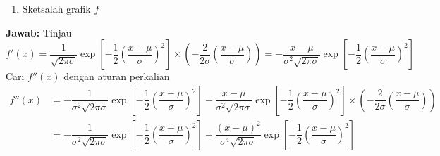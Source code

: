 \documentclass{article}
\begin{document}
\begin{enumerate}
\begin{enumerate}
		\item Sketsalah grafik $f$
	\end{enumerate}
	\textbf{Jawab:} 
	Tinjau 
	$$ f'(x) = \dfrac{1}{\sqrt{2\pi\sigma}} \exp\left[-\dfrac{1}{2}(\dfrac{x-\mu}{\sigma})^2\right]\times \left(-\dfrac{2}{2\sigma}(\dfrac{x-\mu}{\sigma})\right)=-\dfrac{x-\mu}{\sigma^2\sqrt{2\pi\sigma}} \exp\left[-\dfrac{1}{2}(\dfrac{x-\mu}{\sigma})^2\right]$$
	Cari $f''(x)$ dengan aturan perkalian
	\begin{align*}
	f''(x)&=-\dfrac{1}{\sigma^2\sqrt{2\pi\sigma}}\exp\left[-\dfrac{1}{2}(\dfrac{x-\mu}{\sigma})^2\right] -  \dfrac{x-\mu}{\sigma^2\sqrt{2\pi\sigma}}\exp\left[-\dfrac{1}{2}(\dfrac{x-\mu}{\sigma})^2\right]\times \left(-\dfrac{2}{2\sigma}(\dfrac{x-\mu}{\sigma})\right)\\
	&= -\dfrac{1}{\sigma^2\sqrt{2\pi\sigma}}\exp\left[-\dfrac{1}{2}(\dfrac{x-\mu}{\sigma})^2\right] +  \dfrac{(x-\mu)^2}{\sigma^4\sqrt{2\pi\sigma}}\exp\left[-\dfrac{1}{2}(\dfrac{x-\mu}{\sigma})^2\right]
	\end{align*}
\end{enumerate}
\newpage
\end{document}
